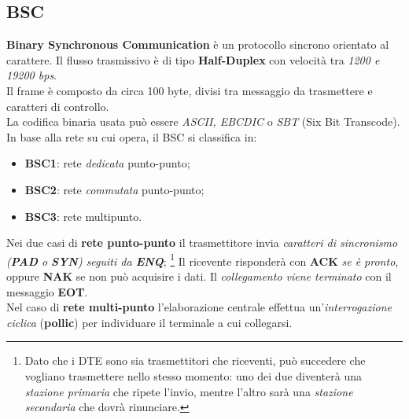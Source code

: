 \documentclass[a4paper,11pt]{article}
\begin{document}
\subsection{BSC}
\textbf{Binary Synchronous Communication} è un protocollo sincrono orientato al carattere. Il flusso trasmissivo è di tipo \textbf{Half-Duplex} con velocità tra \textit{1200 e 19200 bps}.
\\Il frame è composto da circa 100 byte, divisi tra messaggio da trasmettere e caratteri di controllo.
\\La codifica binaria usata può essere \textit{ASCII, EBCDIC } o\textit{ SBT }(Six Bit Transcode).
\\In base alla rete su cui opera, il BSC si classifica in:
\begin{itemize}
	\item \textbf{BSC1}: rete \textit{dedicata }punto-punto;
	\item \textbf{BSC2}: rete \textit{commutata }punto-punto;
	\item \textbf{BSC3}: rete multipunto.
\end{itemize}
Nei due casi di \textbf{rete punto-punto }il trasmettitore invia \textit{caratteri di sincronismo (\textbf{PAD }o \textbf{SYN}) seguiti da \textbf{ENQ}}; \footnote{Dato che i DTE sono sia trasmettitori che riceventi, può succedere che vogliano trasmettere nello stesso momento: uno dei due diventerà una \textit{stazione primaria }che ripete l'invio, mentre l'altro sarà una \textit{stazione
secondaria }che dovrà rinunciare.} Il ricevente risponderà con \textbf{ACK }\textit{se è pronto}, oppure \textbf{NAK }se non può acquisire i dati. Il \textit{collegamento viene terminato }con il messaggio \textbf{EOT}.
\\Nel caso di \textbf{rete multi-punto} l'elaborazione centrale effettua un'\textit{interrogazione ciclica }(\textbf{pollic}) per individuare il terminale a cui collegarsi.
\newpage
\end{document}

